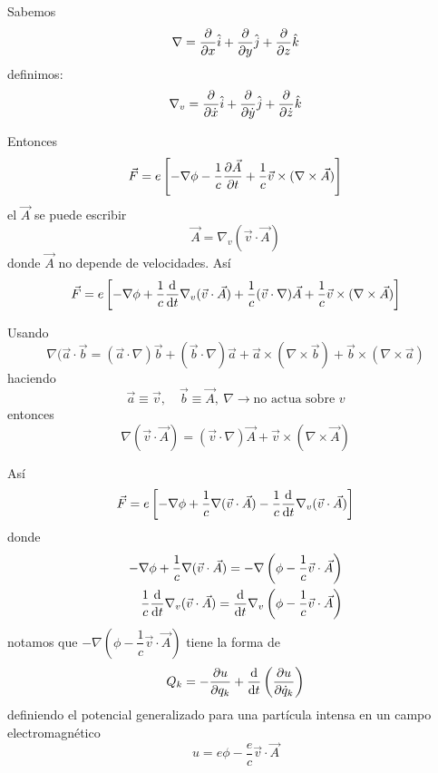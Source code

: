 \documentclass[../main]{subfiles}
\begin{document}
Sabemos
\begin{equation*}
    \nabla=\pdv{}{x}\hat{i}+\pdv{}{y}\hat{j}+\pdv{}{z}\hat{k}
\end{equation*}
definimos:
\begin{equation*}
    \nabla_v =\pdv{}{\dot{x}}\hat{i}+\pdv{}{\dot{y}}\hat{j}+\pdv{}{\dot{z}}\hat{k}
\end{equation*}

Entonces
\begin{equation*}
    \vec{F}=e\left[-\nabla \phi-\dfrac{1}{c}\pdv{\vec{A}}{t}+\dfrac{1}{c}\vec{v}\times(\nabla \times \vec{A})\right]
\end{equation*}
el $\vec{A}$ se puede escribir
\begin{equation*}
    \vec{A}=\nabla_v (\vec{v}\cdot \vec{A})
\end{equation*}
donde $\vec{A}$ no depende de velocidades. Así
\begin{equation*}
    \vec{F}=e\left[-\nabla \phi+\dfrac{1}{c}\dv{}{t}\nabla_v(\vec{v}\cdot \vec{A})+\dfrac{1}{c}(\vec{v}\cdot \nabla)\vec{A}+\dfrac{1}{c}\vec{v}\times(\nabla \times \vec{A})\right]
\end{equation*}

Usando
\begin{equation*}
    \nabla(\vec{a}\cdot \vec{b}=(\vec{a}\cdot \nabla)\vec{b}+(\vec{b}\cdot \nabla)\vec{a}+\vec{a}\times(\nabla \times \vec{b})+\vec{b}\times(\nabla \times \vec{a})
\end{equation*}
haciendo
\begin{equation*}
    \vec{a}\equiv \vec{v}, \quad \vec{b}\equiv \vec{A}, \ \nabla \rightarrow \text{no actua sobre } v
\end{equation*}
entonces
\begin{equation*}
    \nabla (\vec{v}\cdot \vec{A})=(\vec{v}\cdot \nabla)\vec{A}+\vec{v}\times(\nabla \times \vec{A})
\end{equation*}

Así
\begin{equation*}
    \vec{F}=e\left[-\nabla\phi+\dfrac{1}{c}\nabla(\vec{v}\cdot \vec{A})-\dfrac{1}{c}\dv{}{t}\nabla_v(\vec{v}\cdot \vec{A})\right]
\end{equation*}
donde 
\begin{align*}
    -\nabla\phi+\dfrac{1}{c}\nabla(\vec{v}\cdot \vec{A})=-\nabla\left(\phi-\dfrac{1}{c}\vec{v}\cdot \vec{A}\right)\\
    \dfrac{1}{c}\dv{}{t}\nabla_v(\vec{v}\cdot \vec{A})=\dv{}{t}\nabla_v\left(\phi-\dfrac{1}{c}\vec{v}\cdot \vec{A}\right)
\end{align*}
notamos que $-\nabla\left(\phi-\dfrac{1}{c}\vec{v}\cdot \vec{A}\right)$ tiene la forma de
\begin{equation*}
    Q_k=-\pdv{u}{q_k}+\dv{}{t}\left(\pdv{u}{\dot{q}_k}\right)
\end{equation*}
definiendo el potencial generalizado para una partícula intensa en un campo electromagnético
\begin{equation*}
    u=e\phi-\dfrac{e}{c}\vec{v}\cdot \vec{A}
\end{equation*}
\end{document}
